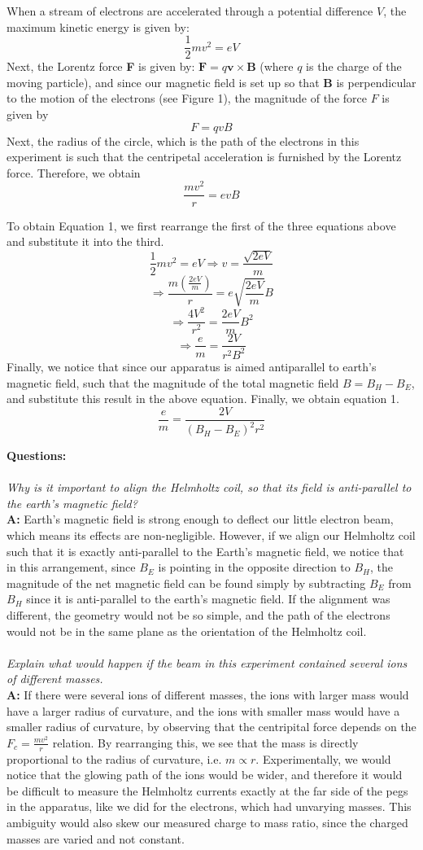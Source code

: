 \documentclass[letterpaper]{article}
\begin{document}
\noindent When a stream of electrons are accelerated through a potential difference $V$, the maximum
kinetic energy is given by:
$$\frac{1}{2}mv^2 = eV$$
Next, the Lorentz force \textbf{F} is given by:
$\textbf{F}=q\textbf{v}\times \textbf{B}$
(where $q$ is the charge of the moving particle), and since our magnetic field is set up so that \textbf{B} is perpendicular to the motion of the electrons (see Figure 1),
the magnitude of the force $F$ is given by $$F=qvB$$
Next, the radius of the circle, which is the path of the electrons in this experiment is such that
the centripetal acceleration is furnished by the Lorentz force. Therefore, we obtain $$\frac{mv^2}{r}=evB$$

\noindent To obtain Equation 1, we first rearrange the first of the three equations above and substitute it into the third.
$$\frac{1}{2}mv^2 = eV \Rightarrow v=\frac{\sqrt{2eV}}{m}$$
$$\Rightarrow \frac{m(\frac{2eV}{m})}{r}=e\sqrt{\frac{2eV}{m}}B$$
$$\Rightarrow \frac{4V^2}{r^2}=\frac{2eV}{m}B^2$$
$$\Rightarrow \frac{e}{m} = \frac{2V}{r^2B^2}$$
Finally, we notice that since our apparatus is aimed antiparallel to earth's magnetic field, such that
the magnitude of the total magnetic field $B=B_H-B_E$, and substitute this result in the above equation.
Finally, we obtain equation 1.
$$\frac{e}{m} = \frac{2V}{(B_H-B_E)^2r^2}$$

\textbf{Questions: }\\ \\
\textit{Why is it important to align the Helmholtz coil, so that its field is
        anti-parallel to the earth's magnetic field?}\\
\textbf{A:}
Earth's magnetic field is strong enough to deflect our little electron beam, which means its effects are non-negligible.
However, if we align our Helmholtz coil such that it is exactly anti-parallel to the Earth's magnetic field, we notice that
in this arrangement, since $B_E$ is pointing in the opposite direction to $B_H$, the magnitude of the net magnetic
field can be found simply by subtracting $B_E$ from $B_H$ since
it is anti-parallel to the earth's magnetic field. If the alignment was different, the geometry would not be so simple, and
the path of the electrons would not be in the same plane as the orientation of the Helmholtz coil.\\ \\
\textit{Explain what would happen if the beam in this experiment contained several ions of different masses.}\\
\textbf{A:}
If there were several ions of different masses, the ions with larger mass would
have a larger radius of curvature, and the ions with smaller mass would have a smaller radius of curvature, by observing that
the centripital force depends on the  $F_c=\frac{mv^2}{r}$ relation. By rearranging this, we see that
the mass is directly proportional to the radius of curvature, i.e. $m\propto r$.
Experimentally, we would notice that the glowing path of the ions would be wider, and therefore it would be difficult to measure
the Helmholtz currents exactly at the far side of the pegs in the apparatus, like we did for the electrons, which had unvarying masses.
This ambiguity would also skew our measured charge to mass ratio, since the charged masses are varied and not constant.
\end{document}
